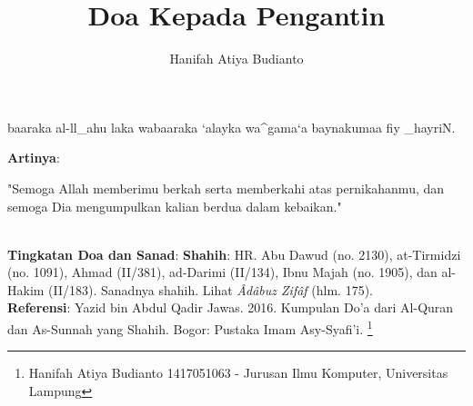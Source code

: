 \documentclass[a4paper,12pt]{article}
\title{\Large Doa Kepada Pengantin}
\author{\calligra Hanifah Atiya Budianto}
\begin{document}
\sffamily
\maketitle 
\fullvocalize
{}
\begin{arabtext}
\noindent
baaraka al-ll_ahu laka wabaaraka `alayka wa^gama`a baynakumaa fiy _hayriN.\\
\end{arabtext}
\noindent
\textbf{Artinya}:
\par
\indent
"Semoga Allah memberimu berkah serta memberkahi atas pernikahanmu, dan 
semoga Dia mengumpulkan kalian berdua dalam kebaikan."\\\\
\par
\noindent
\textbf{Tingkatan Doa dan Sanad}: \textbf{Shahih}: HR. Abu Dawud (no. 
2130), at-Tirmidzi (no. 1091), Ahmad (II/381), ad-Darimi (II/134), Ibnu 
Majah (no. 1905), dan al-Hakim (II/183). Sanadnya shahih. Lihat 
\textit{\^{A}d\^{a}buz Zif\^{a}f} (hlm. 175).\\
\textbf{Referensi}: Yazid bin Abdul Qadir Jawas. 2016. Kumpulan Do'a dari
Al-Quran dan As-Sunnah yang Shahih. Bogor: Pustaka Imam Asy-Syafi'i.
\footnote{Hanifah Atiya Budianto 1417051063 - Jurusan Ilmu Komputer,
Universitas Lampung}
\end{document}
